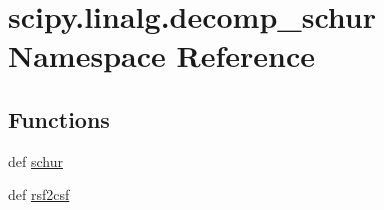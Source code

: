 \hypertarget{namespacescipy_1_1linalg_1_1decomp__schur}{}\section{scipy.\+linalg.\+decomp\+\_\+schur Namespace Reference}
\label{namespacescipy_1_1linalg_1_1decomp__schur}
\subsection*{Functions}
\begin{DoxyCompactItemize}
\item 
def \hyperlink{namespacescipy_1_1linalg_1_1decomp__schur_ac53f71422f1b2beef35daf1f09e24e67}{schur}
\item 
def \hyperlink{namespacescipy_1_1linalg_1_1decomp__schur_a46c66e09bba3b88752ecdf20820476ca}{rsf2csf}
\end{DoxyCompactItemize}
